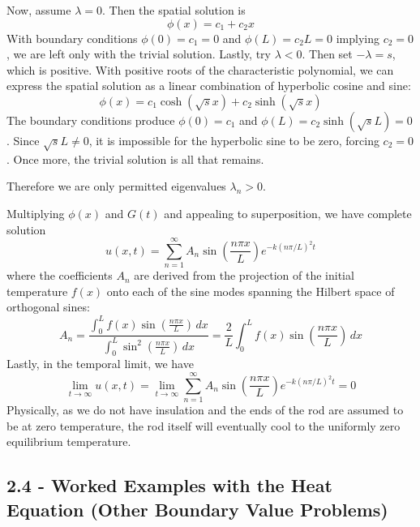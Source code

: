 \documentclass[a4paper]{article}
\begin{document}
Now, assume \( \lambda = 0 \). Then the spatial solution is
\[
	\phi \!\left( x \right) = c_{1} + c_{2}x 
\]
With boundary conditions \( \phi \!\left( 0 \right) = c_{1} = 0 \) and \( \phi \!\left( L \right) = c_{2}L = 0 \) implying \( c_{2} = 0 \), we are left only with the trivial solution. Lastly, try \( \lambda < 0 \). Then set \( -\lambda = s \), which is positive. With positive roots of the characteristic polynomial, we can express the spatial solution as a linear combination of hyperbolic cosine and sine:
\[
	\phi \!\left( x \right) = c_{1}\cosh\!\left(\sqrt{s}x\right) + c_{2}\sinh\!\left(\sqrt{s}x\right) 
\]
The boundary conditions produce \( \phi \!\left( 0 \right) = c_{1} \) and \( \phi \!\left( L \right) = c_{2}\sinh\!\left(\sqrt{s}L\right) = 0 \). Since \( \sqrt{s}L \neq 0 \), it is impossible for the hyperbolic sine to be zero, forcing \( c_{2} = 0 \). Once more, the trivial solution is all that remains.

Therefore we are only permitted eigenvalues \( \lambda_{n} > 0 \).

Multiplying \( \phi \!\left( x \right) \) and \( G \!\left( t \right) \) and appealing to superposition, we have complete solution
\[
	u \!\left( x,t \right) = \sum^{\infty}_{n=1} A_{n}\sin\!\left(\frac{n \pi x}{L}\right)e^{-k \!\left( n \pi / L \right)^{2}t} 
\]
where the coefficients \( A_{n} \) are derived from the projection of the initial temperature \( f \!\left( x \right) \) onto each of the sine modes spanning the Hilbert space of orthogonal sines:
\[
	A_{n} = \frac{\displaystyle{\int^{L}_{0} f \!\left( x \right)\sin\!\left(\frac{n \pi x}{L}\right) \, dx}}{\displaystyle{\int^{L}_{0} \sin^{2}\!\left(\frac{n \pi x}{L}\right) \, dx}} = \frac{2}{L}\int^{L}_{0} f \!\left( x \right)\sin\!\left(\frac{n \pi x}{L}\right) \, dx 
\]
Lastly, in the temporal limit, we have
\[
	\lim\limits_{t \to \infty} u \!\left( x,t \right) = \lim\limits_{t \to \infty} \sum^{\infty}_{n=1} A_{n}\sin\!\left(\frac{n \pi x}{L}\right)e^{-k \!\left( n \pi / L \right)^{2}t} = 0 
\]
Physically, as we do not have insulation and the ends of the rod are assumed to be at zero temperature, the rod itself will eventually cool to the uniformly zero equilibrium temperature.

\newpage
\subsection{\textsf{2.4 - Worked Examples with the Heat Equation (Other Boundary Value Problems)}}
\end{document}
